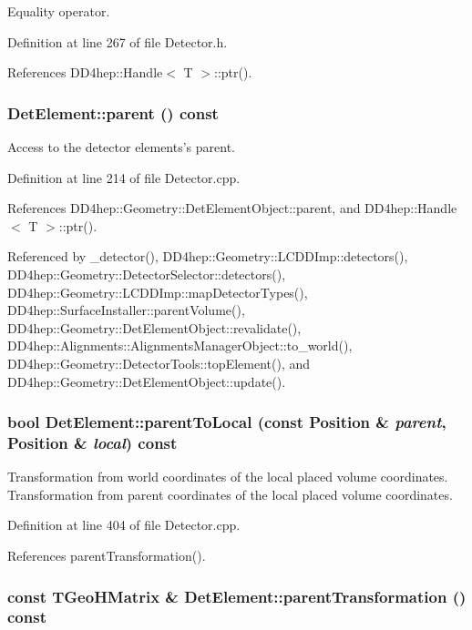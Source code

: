 Equality operator. 

Definition at line 267 of file Detector.h.

References DD4hep::Handle$<$ T $>$::ptr().\hypertarget{class_d_d4hep_1_1_geometry_1_1_det_element_a6a7a665630b1b3af6dd172d9166b8b8d}{
\subsubsection[{parent}]{ DetElement::parent () const}}
\label{class_d_d4hep_1_1_geometry_1_1_det_element_a6a7a665630b1b3af6dd172d9166b8b8d}


Access to the detector elements's parent. 

Definition at line 214 of file Detector.cpp.

References DD4hep::Geometry::DetElementObject::parent, and DD4hep::Handle$<$ T $>$::ptr().

Referenced by \_\-detector(), DD4hep::Geometry::LCDDImp::detectors(), DD4hep::Geometry::DetectorSelector::detectors(), DD4hep::Geometry::LCDDImp::mapDetectorTypes(), DD4hep::SurfaceInstaller::parentVolume(), DD4hep::Geometry::DetElementObject::revalidate(), DD4hep::Alignments::AlignmentsManagerObject::to\_\-world(), DD4hep::Geometry::DetectorTools::topElement(), and DD4hep::Geometry::DetElementObject::update().\hypertarget{class_d_d4hep_1_1_geometry_1_1_det_element_ab9b7683dd7471ffb6195570d5c618a28}{
\subsubsection[{parentToLocal}]{\setlength{\rightskip}{0pt plus 5cm}bool DetElement::parentToLocal (const {\bf Position} \& {\em parent}, \/  {\bf Position} \& {\em local}) const}}
\label{class_d_d4hep_1_1_geometry_1_1_det_element_ab9b7683dd7471ffb6195570d5c618a28}


Transformation from world coordinates of the local placed volume coordinates. Transformation from parent coordinates of the local placed volume coordinates. 

Definition at line 404 of file Detector.cpp.

References parentTransformation().\hypertarget{class_d_d4hep_1_1_geometry_1_1_det_element_a643a213d09ad852e20ec05cedeff78c3}{
\subsubsection[{parentTransformation}]{\setlength{\rightskip}{0pt plus 5cm}const TGeoHMatrix \& DetElement::parentTransformation () const}}
\label{class_d_d4hep_1_1_geometry_1_1_det_element_a643a213d09ad852e20ec05cedeff78c3}


